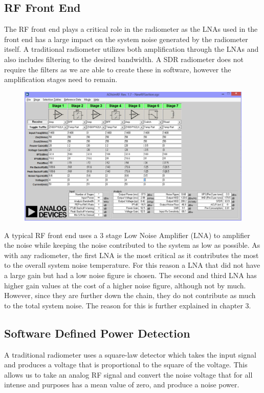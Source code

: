 \subsection{RF Front End}
The RF front end plays a critical role in the radiometer as the LNAs used in the front end has a large impact on the system noise generated by the radiometer itself.  A traditional radiometer utilizes both amplification through the LNAs and also includes filtering to the desired bandwidth.  A SDR radiometer does not require the filters as we are able to create these in software, however the amplification stages need to remain.  

{\begin{figure}[h!tb] 
\centering
\includegraphics[width=0.8\linewidth]{Images/RF_Front_end.png}
\label{ISU_Rad}
\end{figure}
}
A typical RF front end uses a 3 stage Low Noise Amplifier (LNA) to amplifier the noise while keeping the noise contributed to the system as low as possible.  As with any radiometer, the first LNA is the most critical as it contributes the most to the overall system noise temperature.  For this reason a LNA that did not have a large gain but had a low noise figure is chosen. The second and third LNA has higher gain values at the cost of a higher noise figure, although not by much.  However, since they are further down the chain, they do not contribute as much to the total system noise.  The reason for this is further explained in chapter 3. 


\subsection{Software Defined Power Detection}

A traditional radiometer uses a square-law detector which takes the input signal and produces a voltage that is proportional to the square of the voltage.  This allows us to take an analog RF signal and convert the noise voltage that for all intense and purposes has a mean value of zero, and produce a noise power.

